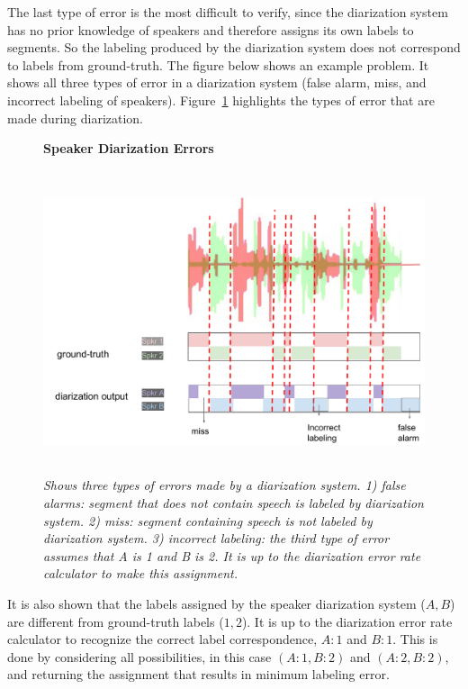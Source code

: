 The last type of error is the most difficult to verify, since the diarization system has no prior knowledge of speakers and therefore assigns its own labels to segments. 
So the labeling produced by the diarization system does not correspond to labels from ground-truth. The figure below shows an example problem. It shows all three types of error in a diarization system (false alarm, miss, and incorrect labeling of speakers). 
Figure~\ref{fig:diarization_der} highlights the types of error that are made during diarization. 

\begin{figure}[h!]
	\centering
	\textbf{Speaker Diarization Errors}\par\medskip
	\includegraphics[height = 3.5in, width=1\textwidth]{figures/diarization_example_der}
	\caption{\it \small Shows three types of errors made by a diarization system. 1) false alarms: segment that does not contain speech is labeled by diarization system. 2) miss: segment containing speech is not labeled by diarization system. 
		3) incorrect labeling: the third type of error assumes that A is 1 and B is 2. It is up to the diarization error rate calculator to make this assignment.}
	\label{fig:diarization_der}
	\vspace{-3mm}
\end{figure}

It is also shown that the labels assigned by the speaker diarization system ($A, B$) are different from ground-truth labels ($1, 2$). 
It is up to the diarization error rate calculator to recognize the correct label correspondence, $A:1$ and $B:1$. 
This is done by considering all possibilities, in this case $(A:1,B:2)$ and $(A:2,B:2)$, and returning the assignment that results in minimum labeling error. 


